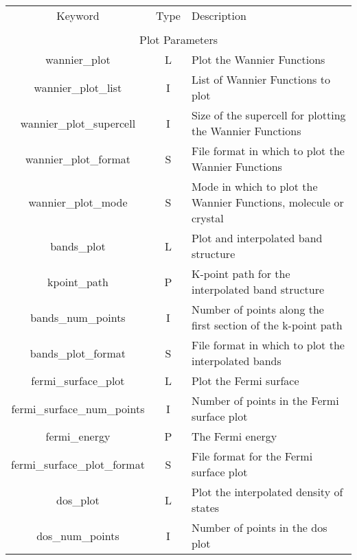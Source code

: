 \begin{table}
\begin{center}
\begin{tabular}{|c|c|p{6cm}|}
\hline
Keyword & Type & Description \\
        &      &             \\
\hline\hline
\multicolumn{3}{|c|}{Plot Parameters} \\
\hline
{\sc wannier\_plot }   & L & Plot the Wannier Functions \\
{\sc wannier\_plot\_list } & I & List of Wannier Functions to plot \\
{\sc wannier\_plot\_supercell }   & I & Size of the supercell for
plotting the Wannier Functions \\
{\sc wannier\_plot\_format }   & S & File format in which to plot the
Wannier Functions \\
{\sc wannier\_plot\_mode }   & S & Mode in which to plot the
Wannier Functions, molecule or crystal \\ 
{\sc bands\_plot }   & L & Plot and interpolated band structure \\
{\sc kpoint\_path }   & P & K-point path for the interpolated band structure  \\
{\sc bands\_num\_points }   & I & Number of points along the first
section of the k-point path \\
{\sc bands\_plot\_format }   & S & File format in which to plot the
interpolated bands \\
{\sc fermi\_surface\_plot }   & L & Plot the Fermi surface \\
{\sc fermi\_surface\_num\_points }   & I & Number of points in the Fermi
surface plot\\
{\sc fermi\_energy }   & P & The Fermi energy \\
{\sc fermi\_surface\_plot\_format }   & S & File format for the Fermi
surface plot \\
{\sc dos\_plot }   & L & Plot the interpolated density of states \\
{\sc dos\_num\_points }   & I & Number of points in the dos plot \\

\end{tabular}
\end{center}
\end{table}
